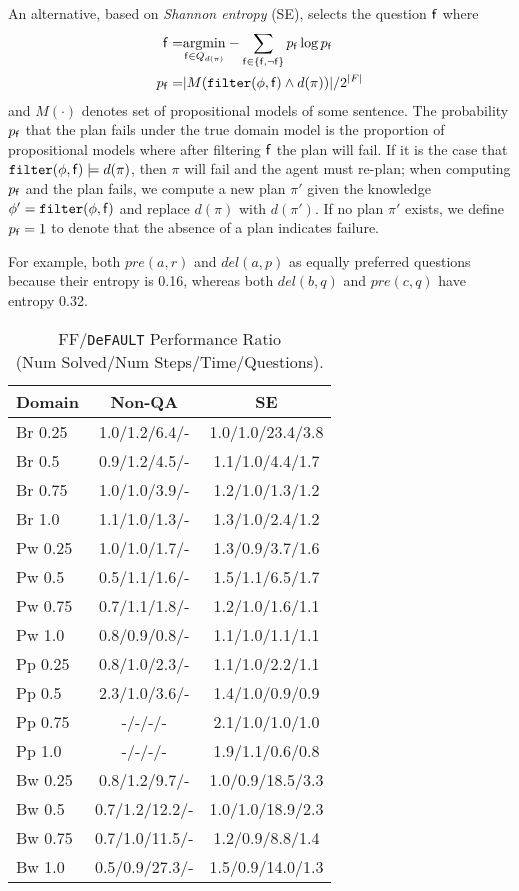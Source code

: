 \documentclass{article}
\def\default{{\tt DeFAULT}}
\begin{document}
An alternative, based on  {\em Shannon entropy} (SE),
selects the question ${\sf f}$ where
\begin{align}
{\sf f} = &\underset{{\sf f}  \in Q_{d(\pi)}}{\operatorname{argmin}} -
\sum\limits_{{\sf f} \in \{{\sf f}, \neg {\sf f}\}} p_{\sf f} \log p_{\sf f} 
\notag\\
 p_{\sf f} =& |M({\tt filter}(\phi, {\sf f}) \wedge 
d(\pi))|/2^{|F|}\notag
\end{align}
and $M(\cdot)$ denotes set of propositional models of some sentence.
The probability $p_{\sf f}$ that the plan fails under the true domain model
is the proportion of propositional models where after filtering ${\sf f}$ the
plan will fail.  If it is the case that ${\tt filter}(\phi, {\sf f}) \models 
d(\pi)$, then $\pi$ will  fail and the agent must re-plan; when computing
$p_{\sf f}$ and the plan fails, we compute a new plan $\pi'$ given the knowledge
$\phi' = {\tt filter}(\phi, {\sf f})$ and replace $d(\pi)$ with $d(\pi')$.  If
no plan $\pi'$ exists, we define $p_{\sf f} = 1$ to denote that the absence of
a plan indicates failure. 

For example, both $pre(a, r)$ and $del(a,
p)$ as equally preferred questions because their entropy is 0.16, whereas both
$del(b, q)$ and $pre(c, q)$ have entropy 0.32.


\begin{table}\small\centering\begin{tabular}{|l|cc|}\hline
Domain & Non-QA  & SE \\ \hline
Br	0.25	 & 1.0/1.2/6.4/-	 & 1.0/1.0/23.4/3.8 	\\ \hline
Br	0.5	 & 0.9/1.2/4.5/-	 & 1.1/1.0/4.4/1.7 	\\ \hline
Br	0.75	 & 1.0/1.0/3.9/-	 & 1.2/1.0/1.3/1.2 	\\ \hline
Br	1.0	 & 1.1/1.0/1.3/-	 & 1.3/1.0/2.4/1.2 	\\ \hline
\hline
Pw	0.25	 & 1.0/1.0/1.7/-	 & 1.3/0.9/3.7/1.6 	\\ \hline
Pw	0.5	 & 0.5/1.1/1.6/-	 & 1.5/1.1/6.5/1.7 	\\ \hline
Pw	0.75	 & 0.7/1.1/1.8/-	 & 1.2/1.0/1.6/1.1 	\\ \hline
Pw	1.0	 & 0.8/0.9/0.8/-	 & 1.1/1.0/1.1/1.1 	\\ \hline
\hline
Pp	0.25	 & 0.8/1.0/2.3/-	 & 1.1/1.0/2.2/1.1 	\\ \hline
Pp	0.5	 & 2.3/1.0/3.6/-	 & 1.4/1.0/0.9/0.9 	\\ \hline
Pp	0.75	 & -/-/-/- 	 & 2.1/1.0/1.0/1.0 	\\ \hline
Pp	1.0	 & -/-/-/- 	 & 1.9/1.1/0.6/0.8 	\\ \hline
\hline
Bw	0.25	 & 0.8/1.2/9.7/- 	 & 1.0/0.9/18.5/3.3 	\\ \hline
Bw	0.5	 & 0.7/1.2/12.2/-	 & 1.0/1.0/18.9/2.3 	\\ \hline
Bw	0.75	 & 0.7/1.0/11.5/-	 & 1.2/0.9/8.8/1.4 	\\ \hline
Bw	1.0	 & 0.5/0.9/27.3/-	 & 1.5/0.9/14.0/1.3 	\\ \hline
\end{tabular}\caption{\label{tab:plannerComp} FF/\default{}
 Performance Ratio \\(Num Solved/Num Steps/Time/Questions).}\end{table}
\end{document}
